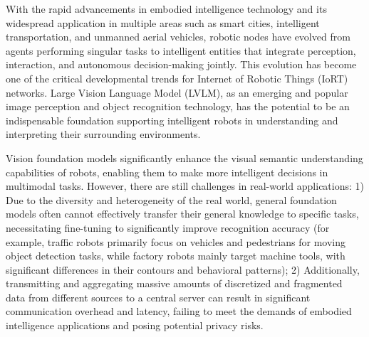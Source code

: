 \documentclass[lettersize,journal]{IEEEtran}
\begin{document}
With the rapid advancements in embodied intelligence technology and its widespread application in multiple areas such as smart cities, intelligent transportation, and unmanned aerial vehicles, robotic nodes have evolved from agents performing singular tasks to intelligent entities that integrate perception, interaction, and autonomous decision-making jointly. This evolution has become one of the critical developmental trends for Internet of Robotic Things (IoRT) networks. Large Vision Language Model (LVLM), as an emerging and popular image perception and object recognition technology, has the potential to be an indispensable foundation supporting intelligent robots in understanding and interpreting their surrounding environments. 

Vision foundation models significantly enhance the visual semantic understanding capabilities of robots, enabling them to make more intelligent decisions in multimodal tasks. However, there are still challenges in real-world applications: 1) Due to the diversity and heterogeneity of the real world, general foundation models often cannot effectively transfer their general knowledge to specific tasks, necessitating fine-tuning to significantly improve recognition accuracy (for example, traffic robots primarily focus on vehicles and pedestrians for moving object detection tasks, while factory robots mainly target machine tools, with significant differences in their contours and behavioral patterns); 2) Additionally, transmitting and aggregating massive amounts of discretized and fragmented data from different sources to a central server can result in significant communication overhead and latency, failing to meet the demands of embodied intelligence applications and posing potential privacy risks. 
\end{document}
